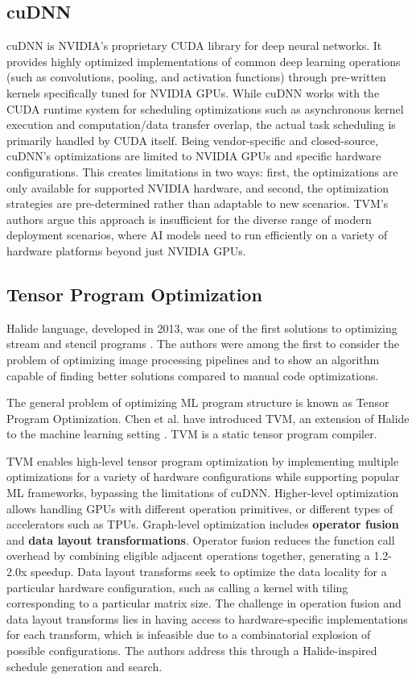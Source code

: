\documentclass[conference]{IEEEtran}
\begin{document}
\subsection{cuDNN}
cuDNN \cite{chetlur_cudnn_2014} is NVIDIA's proprietary CUDA library for deep neural networks. It provides highly optimized implementations of common deep learning operations (such as convolutions, pooling, and activation functions) through pre-written kernels specifically tuned for NVIDIA GPUs. While cuDNN works with the CUDA runtime system for scheduling optimizations such as asynchronous kernel execution and computation/data transfer overlap, the actual task scheduling is primarily handled by CUDA itself. Being vendor-specific and closed-source, cuDNN's optimizations are limited to NVIDIA GPUs and specific hardware configurations. This creates limitations in two ways: first, the optimizations are only available for supported NVIDIA hardware, and second, the optimization strategies are pre-determined rather than adaptable to new scenarios. TVM's authors argue this approach is insufficient for the diverse range of modern deployment scenarios, where AI models need to run efficiently on a variety of hardware platforms beyond just NVIDIA GPUs.


\subsection{Tensor Program Optimization}
Halide language, developed in 2013, was one of the first solutions to optimizing stream and stencil programs \cite{RaganKelley2013HalideAL}. The authors were among the first to consider the problem of optimizing image processing pipelines and to show an algorithm capable of finding better solutions compared to manual code optimizations. 

The general problem of optimizing ML program structure is known as Tensor Program Optimization. Chen et al. have introduced TVM, an extension of Halide to the machine learning setting \cite{chen_tvm_2018}. TVM is a static tensor program compiler.

TVM enables high-level tensor program optimization by implementing multiple optimizations for a variety of hardware configurations while supporting popular ML frameworks, bypassing the limitations of cuDNN. Higher-level optimization allows handling GPUs with different operation primitives, or different types of accelerators such as TPUs. Graph-level optimization includes \textbf{operator fusion} and \textbf{data layout transformations}. Operator fusion reduces the function call overhead by combining eligible adjacent operations together, generating a 1.2-2.0x speedup. Data layout transforms seek to optimize the data locality for a particular hardware configuration, such as calling a kernel with tiling corresponding to a particular matrix size. The challenge in operation fusion and data layout transforms lies in having access to hardware-specific implementations for each transform, which is infeasible due to a combinatorial explosion of possible configurations. The authors address this through a Halide-inspired schedule generation and search. 
\end{document}
